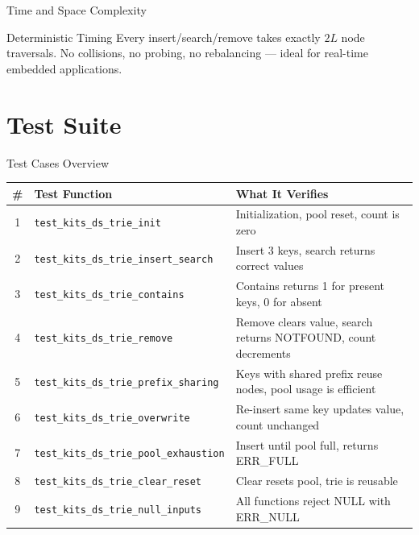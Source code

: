 \documentclass[aspectratio=169, 10pt]{beamer}
\begin{document}
\begin{frame}{Time and Space Complexity}
\vspace{0.5em}
\begin{alertblock}{Deterministic Timing}
Every insert/search/remove takes exactly $2L$ node traversals.
No collisions, no probing, no rebalancing --- ideal for
real-time embedded applications.
\end{alertblock}
\end{frame}

\section{Test Suite}

\begin{frame}{Test Cases Overview}
\begin{table}
\centering
\small
\begin{tabular}{@{}clp{7cm}@{}}
\toprule
\textbf{\#} & \textbf{Test Function} & \textbf{What It Verifies} \\
\midrule
1 & \texttt{test\_kits\_ds\_trie\_init}
  & Initialization, pool reset, count is zero \\
2 & \texttt{test\_kits\_ds\_trie\_insert\_search}
  & Insert 3 keys, search returns correct values \\
3 & \texttt{test\_kits\_ds\_trie\_contains}
  & Contains returns 1 for present keys, 0 for absent \\
4 & \texttt{test\_kits\_ds\_trie\_remove}
  & Remove clears value, search returns NOTFOUND, count decrements \\
5 & \texttt{test\_kits\_ds\_trie\_prefix\_sharing}
  & Keys with shared prefix reuse nodes, pool usage is efficient \\
6 & \texttt{test\_kits\_ds\_trie\_overwrite}
  & Re-insert same key updates value, count unchanged \\
7 & \texttt{test\_kits\_ds\_trie\_pool\_exhaustion}
  & Insert until pool full, returns ERR\_FULL \\
8 & \texttt{test\_kits\_ds\_trie\_clear\_reset}
  & Clear resets pool, trie is reusable \\
9 & \texttt{test\_kits\_ds\_trie\_null\_inputs}
  & All functions reject NULL with ERR\_NULL \\
\bottomrule
\end{tabular}
\end{table}
\end{frame}
\end{document}
